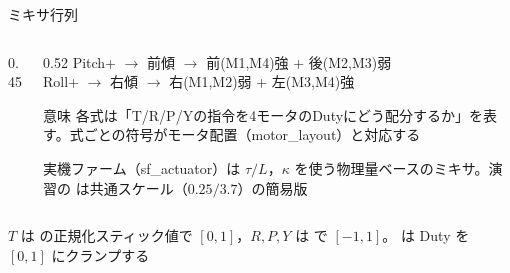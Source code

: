 \begin{frame}{ミキサ行列}
  \begin{columns}[T]
    \begin{column}{0.45\textwidth}
      \centering
      \resizebox{0.95\columnwidth}{!}{}
    \end{column}
    \begin{column}{0.52\textwidth}
      \vspace{0.3em}
      {\footnotesize
      Pitch+ $\to$ 前傾 $\to$ 前(M1,M4)強 + 後(M2,M3)弱\\[2pt]
      Roll+ $\to$ 右傾 $\to$ 右(M1,M2)弱 + 左(M3,M4)強}
      \vspace{0.3em}
      \begin{exampleblock}{意味}\footnotesize
        各式は「T/R/P/Yの指令を4モータのDutyにどう配分するか」を表す。式ごとの符号がモータ配置（motor\_layout）と対応する
      \end{exampleblock}
      \vspace{0.2em}
      {\footnotesize 実機ファーム（sf\_actuator）は $\tau/L$，$\kappa$ を使う物理量ベースのミキサ。演習の  は共通スケール（$0.25/3.7$）の簡易版}
    \end{column}
  \end{columns}

  {\scriptsize $T$ は  の正規化スティック値で $[0,1]$，$R,P,Y$ は  で $[-1,1]$。 は Duty を $[0,1]$ にクランプする}
\end{frame}

